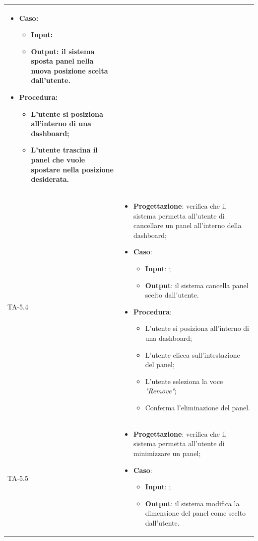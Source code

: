 \begin{longtable}{|C{2.5cm}|C{13cm}|}
\begin{itemize}
	\item \textbf{Caso}: 
	\begin{itemize}
		\item \textbf{Input}:
		\item \textbf{Output}: il sistema sposta panel nella nuova posizione scelta dall'utente.
	\end{itemize}
	\item \textbf{Procedura}:
	\begin{itemize}
		\item L'utente si posiziona all'interno di una dashboard;
		\item L'utente trascina il panel che vuole spostare nella posizione desiderata.
	\end{itemize} 
\end{itemize} \\
\hline
{TA-5.4} &
\begin{itemize}
	\item \textbf{Progettazione}: verifica che il sistema permetta all'utente di cancellare un panel all'interno della dashboard;
	\item \textbf{Caso}: 
	\begin{itemize}
		\item \textbf{Input}: ;
		\item \textbf{Output}: il sistema cancella panel scelto dall'utente.
	\end{itemize}
	\item \textbf{Procedura}:
	\begin{itemize}
		\item L'utente si posiziona all'interno di una dashboard;
		\item L'utente clicca sull'intestazione del panel;
		\item L'utente seleziona la voce \emph{"Remove"};
		\item Conferma l'eliminazione del panel.
	\end{itemize} 
\end{itemize} \\
\hline
{TA-5.5} &
\begin{itemize}
	\item \textbf{Progettazione}: verifica che il sistema permetta all'utente di minimizzare un panel;
	\item \textbf{Caso}: 
	\begin{itemize}
		\item \textbf{Input}: ;
		\item \textbf{Output}: il sistema modifica la dimensione del panel come scelto dall'utente.

\end{itemize}
\end{itemize}
\end{longtable}
